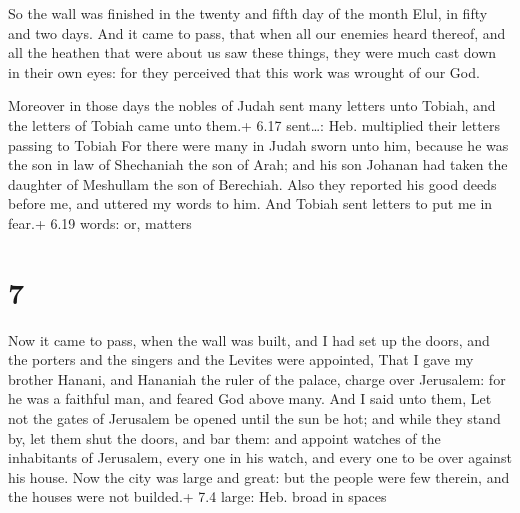  So the wall was finished in the twenty and fifth day of
the month Elul, in fifty and two days.  And it came to
pass, that when all our enemies heard thereof, and all the heathen that
were about us saw these things, they were much cast down in their own
eyes: for they perceived that this work was wrought of our God.

 Moreover in those days the nobles of Judah sent many
letters unto Tobiah, and the letters of Tobiah came unto them.+ 6.17
sent\ldots: Heb. multiplied their letters passing to Tobiah
 For there were many in Judah sworn unto him, because he
was the son in law of Shechaniah the son of Arah; and his son Johanan
had taken the daughter of Meshullam the son of Berechiah. 
Also they reported his good deeds before me, and uttered my words to
him. And Tobiah sent letters to put me in fear.+ 6.19 words: or, matters

\hypertarget{section-6}{%
\section{7}\label{section-6}}

 Now it came to pass, when the wall was built, and I had set
up the doors, and the porters and the singers and the Levites were
appointed,  That I gave my brother Hanani, and Hananiah the
ruler of the palace, charge over Jerusalem: for he was a faithful man,
and feared God above many.  And I said unto them, Let not
the gates of Jerusalem be opened until the sun be hot; and while they
stand by, let them shut the doors, and bar them: and appoint watches of
the inhabitants of Jerusalem, every one in his watch, and every one to
be over against his house.  Now the city was large and
great: but the people were few therein, and the houses were not
builded.+ 7.4 large: Heb. broad in spaces

